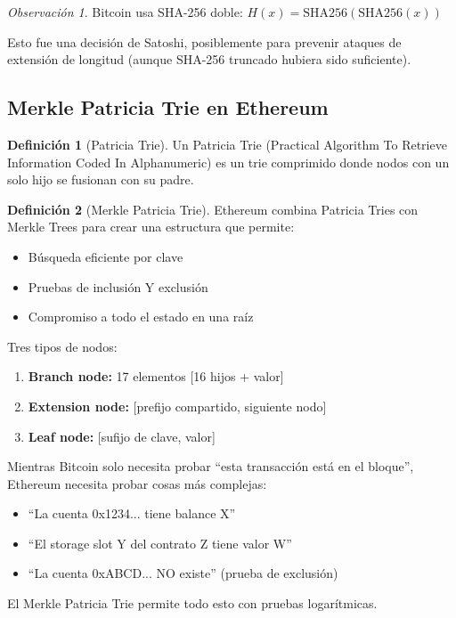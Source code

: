 \documentclass[11pt,a4paper,twoside,openright]{book}
\theoremstyle{definition}
\newtheorem{definition}{Definición}[chapter]
\theoremstyle{plain}
\theoremstyle{remark}
\newtheorem{remark}{Observación}[chapter]
\begin{document}
\begin{remark}
Bitcoin usa SHA-256 doble: $H(x) = \text{SHA256}(\text{SHA256}(x))$

Esto fue una decisión de Satoshi, posiblemente para prevenir ataques de extensión de longitud (aunque SHA-256 truncado hubiera sido suficiente).
\end{remark}

\subsection{Merkle Patricia Trie en Ethereum}

\begin{definition}[Patricia Trie]
Un Patricia Trie (Practical Algorithm To Retrieve Information Coded In Alphanumeric) es un trie comprimido donde nodos con un solo hijo se fusionan con su padre.
\end{definition}

\begin{definition}[Merkle Patricia Trie]
Ethereum combina Patricia Tries con Merkle Trees para crear una estructura que permite:
\begin{itemize}
    \item Búsqueda eficiente por clave
    \item Pruebas de inclusión Y exclusión
    \item Compromiso a todo el estado en una raíz
\end{itemize}

Tres tipos de nodos:
\begin{enumerate}
    \item \textbf{Branch node:} 17 elementos [16 hijos + valor]
    \item \textbf{Extension node:} [prefijo compartido, siguiente nodo]
    \item \textbf{Leaf node:} [sufijo de clave, valor]
\end{enumerate}
\end{definition}

\begin{intuicion}
Mientras Bitcoin solo necesita probar ``esta transacción está en el bloque'', Ethereum necesita probar cosas más complejas:
\begin{itemize}
    \item ``La cuenta 0x1234... tiene balance X''
    \item ``El storage slot Y del contrato Z tiene valor W''
    \item ``La cuenta 0xABCD... NO existe'' (prueba de exclusión)
\end{itemize}

El Merkle Patricia Trie permite todo esto con pruebas logarítmicas.
\end{intuicion}
\end{document}
